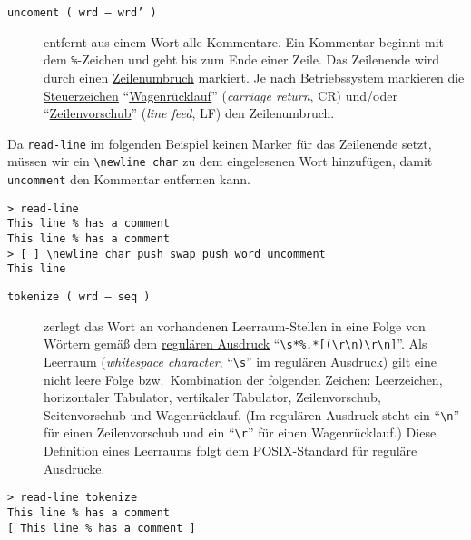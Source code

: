 \begin{description}
\item[\texttt{uncoment ( wrd -- wrd' )}] entfernt aus einem Wort alle Kommentare. Ein Kommentar beginnt mit dem \verb|%|-Zeichen
und geht bis zum Ende einer Zeile. Das Zeilenende wird durch einen \href{http://de.wikipedia.org/wiki/Zeilenumbruch}{Zeilenumbruch} markiert. Je nach Betriebssystem markieren die \href{http://de.wikipedia.org/wiki/Steuerzeichen}{Steuerzeichen} "`\href{http://de.wikipedia.org/wiki/Wagenr\%C3\%BCcklauf}{Wagenrücklauf}"' (\emph{carriage return}, CR) und\slash oder "`\href{http://de.wikipedia.org/wiki/Zeilenvorschub}{Zeilenvorschub}"' (\emph{line feed}, LF) den Zeilenumbruch.
\end{description}

Da \verb|read-line| im folgenden Beispiel keinen Marker für das Zeilenende setzt, müssen wir ein \verb|\newline char| zu dem eingelesenen Wort hinzufügen, damit \verb|uncomment| den Kommentar entfernen kann.

\begin{verbatim}
> read-line
This line % has a comment
This line % has a comment
> [ ] \newline char push swap push word uncomment
This line
\end{verbatim}

\begin{description}
\item[\texttt{tokenize ( wrd -- seq )}] zerlegt das Wort an vorhandenen Leerraum-Stellen in eine Folge von Wörtern gemäß dem \href{http://de.wikipedia.org/wiki/Regul\%C3\%A4rer\_Ausdruck}{regulären Ausdruck} "`\verb|\s*%.*[(\r\n)\r\n]|"'.
Als \href{http://de.wikipedia.org/wiki/Leerraum}{Leerraum} (\emph{whitespace character}, "`\verb|\s|"' im regulären Ausdruck) gilt eine nicht leere Folge bzw.\ Kombination der folgenden Zeichen: Leerzeichen, horizontaler Tabulator, vertikaler Tabulator, Zeilenvorschub, Seitenvorschub und
Wagenrücklauf. (Im regulären Ausdruck steht ein "`\verb|\n|"' für einen Zeilenvorschub und ein "`\verb|\r|"' für einen Wagenrücklauf.) Diese Definition eines Leerraums folgt dem \href{http://de.wikipedia.org/wiki/POSIX}{POSIX}-Standard für reguläre Ausdrücke.
\end{description}

\begin{verbatim}
> read-line tokenize
This line % has a comment
[ This line % has a comment ]
\end{verbatim}

